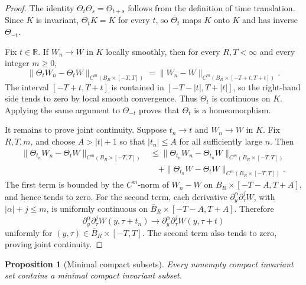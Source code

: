 \documentclass[11pt]{amsart}
\theoremstyle{plain}
\newtheorem{proposition}[theorem]{Proposition}
\theoremstyle{definition}
\theoremstyle{remark}
\numberwithin{equation}{section}
\begin{document}
\begin{proof}
The identity \(\Theta_t\Theta_s=\Theta_{t+s}\) follows from the definition of
time translation.  Since \(K\) is invariant, \(\Theta_tK=K\) for every
\(t\), so \(\Theta_t\) maps \(K\) onto \(K\) and has inverse
\(\Theta_{-t}\).

Fix \(t\in\mathbb R\).  If \(W_n\to W\) in \(K\) locally smoothly, then for
every \(R,T<\infty\) and every integer \(m\ge0\),
\[
   \|\Theta_tW_n-\Theta_tW\|_{C^m(B_R\times[-T,T])}
   =
   \|W_n-W\|_{C^m(B_R\times[-T+t,T+t])}.
\]
The interval \([-T+t,T+t]\) is contained in \([-T-|t|,T+|t|]\), so the
right-hand side tends to zero by local smooth convergence.  Thus
\(\Theta_t\) is continuous on \(K\).  Applying the same argument to
\(\Theta_{-t}\) proves that \(\Theta_t\) is a homeomorphism.

It remains to prove joint continuity.  Suppose \(t_n\to t\) and
\(W_n\to W\) in \(K\).  Fix \(R,T,m\), and choose \(A>|t|+1\) so that
\(|t_n|\le A\) for all sufficiently large \(n\).  Then
\begin{align*}
   \|\Theta_{t_n}W_n-\Theta_tW\|_{C^m(B_R\times[-T,T])}
   &\le
   \|\Theta_{t_n}W_n-\Theta_{t_n}W\|_{C^m(B_R\times[-T,T])} \\
   &\quad+
   \|\Theta_{t_n}W-\Theta_tW\|_{C^m(B_R\times[-T,T])}.
\end{align*}
The first term is bounded by the \(C^m\)-norm of \(W_n-W\) on
\(B_R\times[-T-A,T+A]\), and hence tends to zero.  For the second term,
each derivative \(\partial_y^\alpha\partial_\tau^jW\), with
\(|\alpha|+j\le m\), is uniformly continuous on
\(\overline B_R\times[-T-A,T+A]\).  Therefore
\[
   \partial_y^\alpha\partial_\tau^jW(y,\tau+t_n)
   \to
   \partial_y^\alpha\partial_\tau^jW(y,\tau+t)
\]
uniformly for \((y,\tau)\in\overline B_R\times[-T,T]\).  The second term
also tends to zero, proving joint continuity.
\end{proof}

\begin{proposition}[Minimal compact subsets]\label{prop:minimal-subset}
Every nonempty compact invariant set contains a minimal compact invariant
subset.
\end{proposition}
\end{document}
